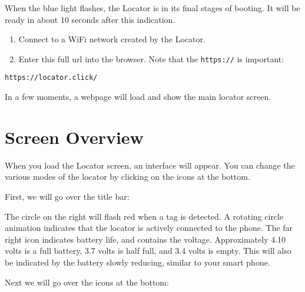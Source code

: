 \documentclass[
]{article}
\begin{document}
When the blue light flashes, the Locator is in its final stages of
booting. It will be ready in about 10 seconds after this indication.

\begin{enumerate}
\def\labelenumi{\arabic{enumi}.}
\setcounter{enumi}{1}
\item
  Connect to a WiFi network created by the Locator.
\item
  Enter this full url into the browser. Note that the \texttt{https://}
  is important:
\end{enumerate}

\begin{verbatim}
https://locator.click/
\end{verbatim}

In a few moments, a webpage will load and show the main locator screen.

\hypertarget{screen-overview}{%
\section{Screen Overview}\label{screen-overview}}

When you load the Locator screen, an interface will appear. You can
change the various modes of the locator by clicking on the icons at the
bottom.

First, we will go over the title bar:

The circle on the right will flash red when a tag is detected. A
rotating circle animation indicates that the locator is actively
connected to the phone. The far right icon indicates battery life, and
contains the voltage. Approximately 4.10 volts is a full battery, 3.7
volts is half full, and 3.4 volts is empty. This will also be indicated
by the battery slowly reducing, similar to your smart phone.

Next we will go over the icons at the bottom:
\end{document}

